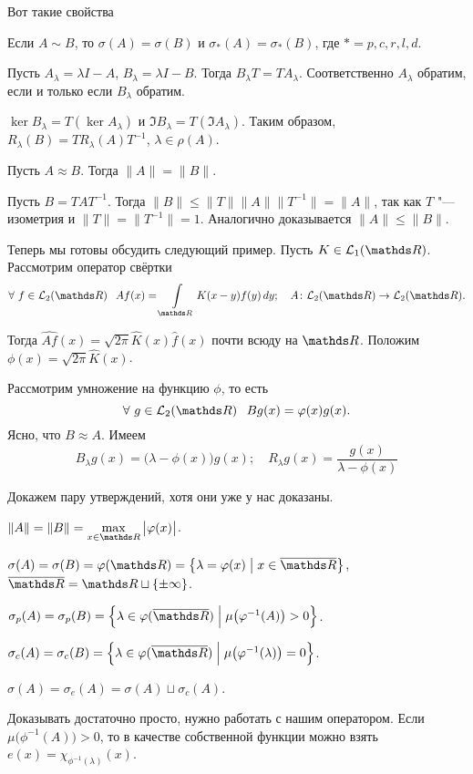 Вот такие свойства
\begin{Ut}
  Если $A\sim B$, то $\sigma(A) = \sigma(B)$ и $\sigma_*(A) = \sigma_*(B)$, где $* = p,c,r,l,d$.
\end{Ut}
\begin{Proof}
  Пусть $A_\lambda = \lambda I - A$, $B_\lambda = \lambda I - B$. Тогда $B_\lambda T = T A_\lambda$. Соответственно $A_\lambda$ обратим, если и только если $B_\lambda$ обратим.

$\ker B_\lambda = T(\ker A_\lambda)$ и $\Im B_\lambda = T(\Im A_\lambda)$. Таким образом, $R_\lambda(B) = T R_\lambda(A) T^{-1}$, $\lambda\in\rho(A)$.
\end{Proof}

\begin{Ut}
  Пусть $A\approx B$. Тогда $\|A\|=\|B\|$.
\end{Ut}
\begin{Proof}
  Пусть $B = TAT^{-1}$. Тогда $\|B\|\le \|T\| \|A\| \|T^{-1}\| = \|A\|$, так как $T$ "--- изометрия и $\|T\| = \|T^{-1}\| = 1$. Аналогично доказывается $\|A\|\le \|B\|$. 
\end{Proof}

Теперь мы готовы обсудить следующий пример. Пусть $K\in \L_1(\R)$. Рассмотрим оператор свёртки
\[
  \forall\ f\in\L_2(\R)\pau A f(x) = \Gint{\R} K(x-y) f(y)\,dy;\quad A\colon \L_2(\R)\to\L_2(\R).
\]

Тогда $\widehat{A f}(x) = \sqrt{2\pi} \hat K(x)\hat f(x)$ почти всюду на $\R$. Положим $\phi(x) = \sqrt{2\pi}\hat K(x)$.

Рассмотрим умножение на функцию $\phi$, то есть
\[
  \forall\ g\in\L_2(\R)\pau Bg(x) = \phi(x)g(x).
\]
Ясно, что $B\approx A$. Имеем
\[
  B_\lambda g(x) = \big(\lambda- \phi(x)\big)g(x);\quad
  R_\lambda g(x) = \frac{g(x)}{\lambda-\phi(x)}
\]

Докажем пару утверждений, хотя они уже у нас доказаны.
\begin{azItems}
\item $\|A\| = \|B\| = \max\limits_{x\in\R}\big|\phi(x)\big|$.
\item $\sigma(A) = \sigma(B) = \phi(\R) = \big\{\lambda = \phi(x)\bigm|x\in\ol\R\big\}$, $\ol\R = \R\sqcup\{\pm\infty\}$.
\item $\sigma_p(A) = \sigma_p(B) = \Big\{\lambda\in\phi(\ol\R)\Bigm|\mu\big(\phi^{-1}(A)\big)>0\Big\}$.
\item $\sigma_c(A) = \sigma_c(B) = 
  \Big\{ \lambda\in\phi(\ol\R)\Bigm| \mu\big(\phi^{-1}(\lambda)\big)=0\Big\}$.
\item $\sigma(A) = \sigma_e(A) = \sigma(A)\sqcup \sigma_c(A)$.
\end{azItems}
Доказывать достаточно просто, нужно работать с нашим оператором. Если $\mu\big(\phi^{-1}(A)\big)>0$, то в качестве собственной функции можно взять $e(x) = \chi_{\phi^{-1}(\lambda)}(x)$.

